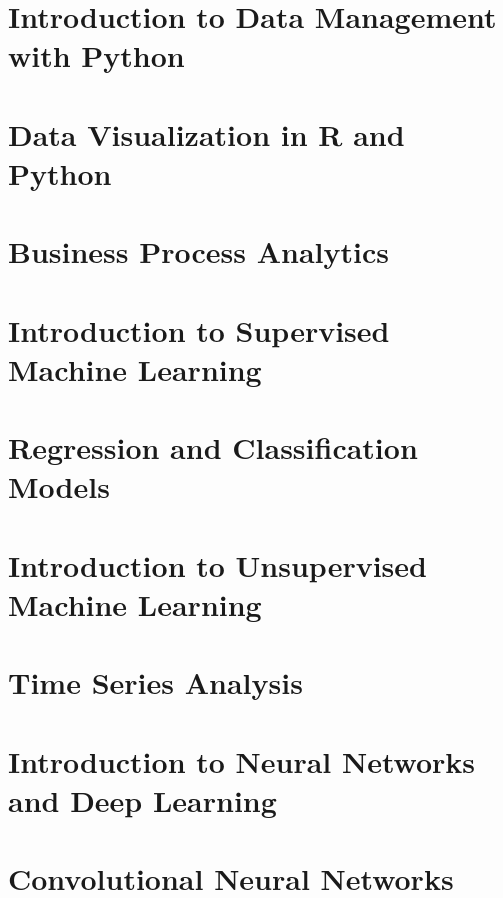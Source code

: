 \documentclass{book}
\begin{document}
\graphicspath{{class06/}}
\chapter{Introduction to Data Management with Python}


\graphicspath{{class07/}}
\chapter{Data Visualization in R and Python}


\graphicspath{{class09/}}
\chapter{Business Process Analytics}


\graphicspath{{class11/}}
\chapter{Introduction to Supervised Machine Learning}


\graphicspath{{class12/}}
\chapter{Regression and Classification Models}


\graphicspath{{class13/}}
\chapter{Introduction to Unsupervised Machine Learning}


\graphicspath{{class14/}}
\chapter{Time Series Analysis}


\graphicspath{{class15/}}
\chapter{Introduction to Neural Networks and Deep Learning}


\graphicspath{{class16/}}
\chapter{Convolutional Neural Networks}

\end{document}
